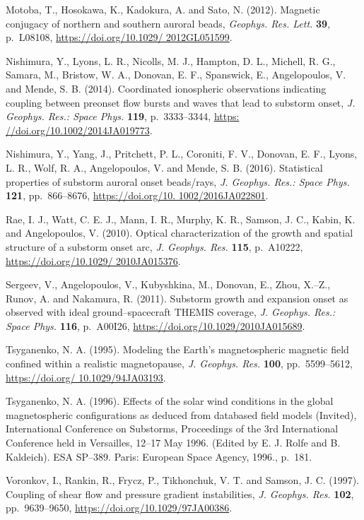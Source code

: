 \documentclass[a4paper,openany,12pt]{book}
\begin{document}
\begin{thebibliography}{100}
\bibitem{}
Motoba, T., Hosokawa, K., Kadokura, A. and Sato, N. (2012). Magnetic conjugacy of northern and southern auroral beads, \emph{Geophys. Res. Lett.} \textbf{39}, p.~L08108, \url{https://doi.org/10.1029/ 2012GL051599}.

\bibitem{}
Nishimura, Y., Lyons, L. R., Nicolls, M. J., Hampton, D. L., Michell, R. G., Samara, M., Bristow, W. A., Donovan, E. F., Spanswick, E., Angelopoulos, V. and Mende, S. B. (2014). Coordinated ionospheric observations indicating coupling between preonset flow bursts and waves that lead to substorm onset, \emph{J. Geophys. Res.: Space Phys.} 
\textbf{119}, p.~3333--3344, \url{https: //doi.org/10.1002/2014JA019773}.

\bibitem{}
Nishimura, Y., Yang, J., Pritchett, P. L., Coroniti, F. V., Donovan, E. F., Lyons, L. R., Wolf, R. A., Angelopoulos, V. and Mende, S. B. (2016). Statistical properties of substorm auroral onset beads/rays, \emph{J. Geophys. Res.: Space Phys.} \textbf{121}, pp.~866--8676, \url{https://doi.org/10. 1002/2016JA022801}.

\bibitem{}
Rae, I. J., Watt, C. E. J., Mann, I. R., Murphy, K. R., Samson, J. C., Kabin, K. and Angelopoulos, V. (2010). Optical characterization of the growth and spatial structure of a substorm onset arc, \emph{J. Geophys. Res.} \textbf{115}, 
p.~A10222, \url{https://doi.org/10.1029/ 2010JA015376}.

\bibitem{}
Sergeev, V., Angelopoulos, V., Kubyshkina, M., Donovan, E., Zhou, X.--Z., Runov, A. and Nakamura, R. (2011). Substorm growth and expansion onset as observed with ideal ground--spacecraft THEMIS coverage, \emph{J. Geophys. Res.: Space Phys.} \textbf{116}, p.~A00I26, \url{https://doi.org/10.1029/2010JA015689}.

\bibitem{}
Tsyganenko, N. A. (1995). Modeling the Earth's magnetospheric magnetic field confined within a realistic magnetopause, \emph{J. Geophys. Res.} \textbf{100}, pp.~5599--5612, \url{https://doi.org/ 10.1029/94JA03193}.

\bibitem{}
Tsyganenko, N. A. (1996). Effects of the solar wind conditions in the global magnetospheric configurations as deduced from databased field models (Invited), International Conference on Substorms, Proceedings of the 3rd International Conference held in Versailles, 12--17 May 1996. (Edited by E. J. Rolfe and B. Kaldeich). ESA SP--389. Paris: European Space Agency, 1996., p.~181.

\bibitem{}
Voronkov, I., Rankin, R., Frycz, P., Tikhonchuk, V. T. and Samson, J. C. (1997). Coupling of shear flow and pressure gradient instabilities, \emph{J. Geophys. Res.} \textbf{102}, pp.~9639--9650, \url{https://doi.org/10.1029/97JA00386}.


\end{thebibliography}
\end{document}
